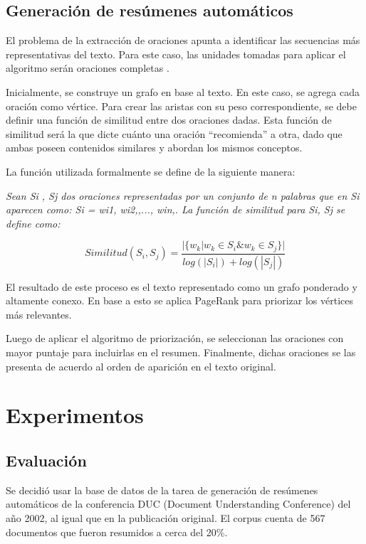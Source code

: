 \documentclass{llncs}
\begin{document}
\subsection{Generación de resúmenes automáticos}
El problema de la extracción de oraciones apunta a identificar las secuencias más representativas del texto. Para este caso, las unidades tomadas para aplicar el algoritmo serán oraciones completas \cite{introductionir}.

Inicialmente, se construye un grafo en base al texto. En este caso, se agrega cada oración como vértice. Para crear las aristas con su peso correspondiente, se debe definir una función de similitud entre dos oraciones dadas. Esta función de similitud será la que dicte cuánto una oración “recomienda” a otra, dado que ambas poseen contenidos similares y abordan los mismos conceptos.
    
La función utilizada formalmente se define de la siguiente manera:

\textit{Sean Si , Sj dos oraciones representadas por un conjunto de n palabras que en Si aparecen como: Si = wi1, wi2,,..., win,. La función de similitud para Si, Sj se define como:}

\begin{equation}
Similitud(S_{i},S_{j}) = \frac{ | \{   w_{k} | w_{k} \in S_{i} \& w_{k} \in S_{j}   \}  | }    
                              {  log(|S_{i}|) + log(|S_{j}|)  }
\end{equation}
    
El resultado de este proceso es el texto representado como un grafo ponderado y altamente conexo. En base a esto se aplica PageRank para priorizar los vértices más relevantes.

Luego de aplicar el algoritmo de priorización, se seleccionan las oraciones con mayor puntaje para incluirlas en el resumen. Finalmente, dichas oraciones se las presenta de acuerdo al orden de aparición en el texto original.


\section{Experimentos}

\subsection{Evaluación}
Se decidió usar la base de datos de la tarea de generación de resúmenes automáticos de la conferencia DUC (Document Understanding Conference) del año 2002, al igual que en la publicación original. El corpus cuenta de 567 documentos que fueron resumidos a cerca del 20\%.
\end{document}
